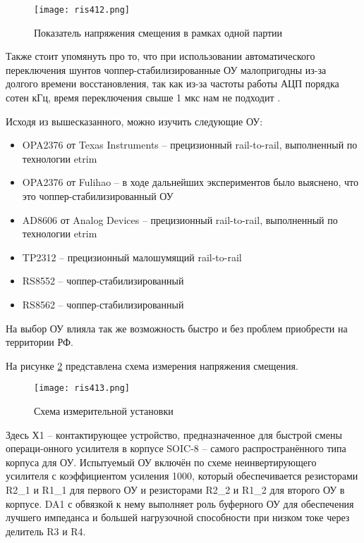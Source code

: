 \begin{figure}[H]
\centering
\texttt{[image: ris412.png]}
\caption{Показатель напряжения смещения в рамках одной партии}
\label{ris:412}
\end{figure}

Также стоит упомянуть про то, что при использовании автоматического переключения шунтов 
чоппер-стабилизированные ОУ малопригодны из-за долгого времени восстановления, так как из-за частоты работы
АЦП порядка сотен кГц, время переключения свыше 1 мкс нам не подходит \cite{Chopper:OU}.

Исходя из вышесказанного, можно изучить следующие ОУ:

\begin{itemize}
    \item OPA2376 от Texas Instruments -- прецизионный rail-to-rail, выполненный по технологии etrim
    \item OPA2376 от Fulihao -- в ходе дальнейших экспериментов было выяснено, что это 
    чоппер-стабилизированный ОУ
    \item AD8606 от Analog Devices -- прецизионный rail-to-rail, выполненный по технологии etrim
    \item TP2312 -- прецизионный малошумящий rail-to-rail
    \item RS8552 -- чоппер-стабилизированный
    \item RS8562 -- чоппер-стабилизированный
\end{itemize}

На выбор ОУ влияла так же возможность быстро и без проблем приобрести на территории РФ. 

На рисунке \ref{ris:413} представлена схема измерения напряжения смещения.

\begin{figure}[H]
    \centering
    \texttt{[image: ris413.png]}
    \caption{Схема измерительной установки}
    \label{ris:413}
    \end{figure}

Здесь Х1 -- контактирующее устройство, предназначенное для быстрой смены операци-онного усилителя в 
корпусе SOIC-8 -- самого распространённого типа корпуса для ОУ. Испытуемый ОУ включён по схеме неинвертирующего 
усилителя с коэффициентом усиления 1000, который обеспечивается резисторами R2\_1 и R1\_1 для первого ОУ и
резисторами R2\_2 и R1\_2 для второго ОУ в корпусе. DA1 с обвязкой к нему выполняет роль буферного ОУ для 
обеспечения лучшего импеданса и большей нагрузочной способности при низком токе через делитель R3 и R4.

